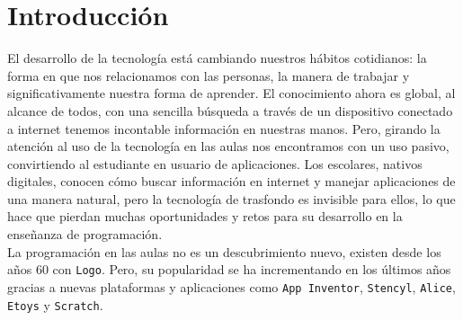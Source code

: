 \documentclass[a4paper, 12pt]{book}
\begin{document}


\tableofcontents
\cleardoublepage
\listoffigures %



\cleardoublepage
\chapter{Introducción}
\label{sec:intro} %

El desarrollo de la tecnología está cambiando nuestros hábitos cotidianos: la forma
en que nos relacionamos con las personas, la manera de trabajar y significativamente
nuestra forma de aprender. El conocimiento ahora es global, al alcance de todos, con
una sencilla búsqueda a través de un dispositivo conectado a internet tenemos incontable
información en nuestras manos. Pero, girando la atención al uso de la tecnología en las 
aulas nos encontramos con un uso pasivo, convirtiendo al estudiante en usuario de 
aplicaciones. Los escolares, nativos digitales, conocen cómo buscar información en internet 
y manejar aplicaciones de una manera natural, pero la tecnología de trasfondo es invisible 
para ellos, lo que hace que pierdan muchas oportunidades y retos para su desarrollo en la
enseñanza de programación. \\

La programación en las aulas no es un descubrimiento nuevo, existen desde los años 60  con 
\texttt{Logo}. Pero, su popularidad se ha incrementando en los últimos años gracias a nuevas 
plataformas y aplicaciones como \texttt{App Inventor}, \texttt{Stencyl}, \texttt{Alice}, 
\texttt{Etoys} y \texttt{Scratch}. \\
\end{document}
